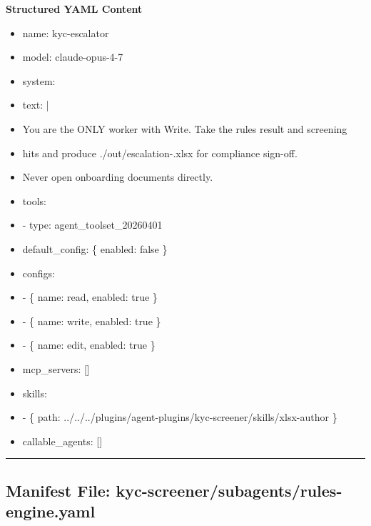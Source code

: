 \documentclass[11pt]{article}
\begin{document}
\textbf{Structured YAML Content}
\begin{itemize}[leftmargin=*,itemsep=2pt,topsep=2pt]
\item {} name: kyc-escalator
\item {} model: claude-opus-4-7
\item {} system:
\item {} text: |
\item {} You are the ONLY worker with Write. Take the rules result and screening
\item {} hits and produce ./out/escalation-.xlsx for compliance sign-off.
\item {} Never open onboarding documents directly.
\item {} tools:
\item {} - type: agent\_\allowbreak{}toolset\_\allowbreak{}20260401
\item {} default\_\allowbreak{}config: \{ enabled: false \}
\item {} configs:
\item {} - \{ name: read, enabled: true \}
\item {} - \{ name: write, enabled: true \}
\item {} - \{ name: edit, enabled: true \}
\item {} mcp\_\allowbreak{}servers: []
\item {} skills:
\item {} - \{ path: ../../../plugins/agent-plugins/kyc-screener/skills/xlsx-author \}
\item {} callable\_\allowbreak{}agents: []
\end{itemize}

\vspace{0.8em}\hrule\vspace{0.8em}

\subsection{Manifest File: kyc-screener/subagents/rules-engine.yaml}\label{file:kyc-screener-subagents-rules-engine-yaml}
\end{document}
